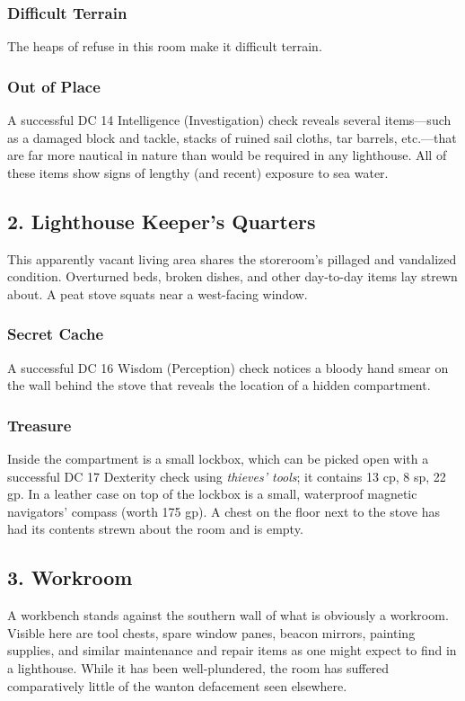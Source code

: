 \documentclass[10pt,a4paper,twoside,bg=print,twocolumn,openany,nodeprecatedcode]{dndbook}
\begin{document}
\subsubsection{Difficult Terrain}
The heaps of refuse in this room make it difficult terrain.

\subsubsection{Out of Place}
A successful DC 14 Intelligence (Investigation) check reveals several items—such as a damaged block and tackle, stacks of ruined sail cloths, tar barrels, etc.—that are far more nautical in nature than would be required in any lighthouse. All of these items show signs of lengthy (and recent) exposure to sea water.

\subsection{2. Lighthouse Keeper's Quarters}
\begin{DndReadAloud}{}
This apparently vacant living area shares the storeroom's pillaged and vandalized condition. Overturned beds, broken dishes, and other day-to-day items lay strewn about. A peat stove squats near a west-facing window.

\end{DndReadAloud}

\subsubsection{Secret Cache}
A successful DC 16 Wisdom (Perception) check notices a bloody hand smear on the wall behind the stove that reveals the location of a hidden compartment.

\subsubsection{Treasure}
Inside the compartment is a small lockbox, which can be picked open with a successful DC 17 Dexterity check using \textit{thieves' tools}; it contains 13 cp, 8 sp, 22 gp. In a leather case on top of the lockbox is a small, waterproof magnetic navigators' compass (worth 175 gp). A chest on the floor next to the stove has had its contents strewn about the room and is empty.

\subsection{3. Workroom}
\begin{DndReadAloud}{}
A workbench stands against the southern wall of what is obviously a workroom. Visible here are tool chests, spare window panes, beacon mirrors, painting supplies, and similar maintenance and repair items as one might expect to find in a lighthouse. While it has been well-plundered, the room has suffered comparatively little of the wanton defacement seen elsewhere.

\end{DndReadAloud}
\end{document}
